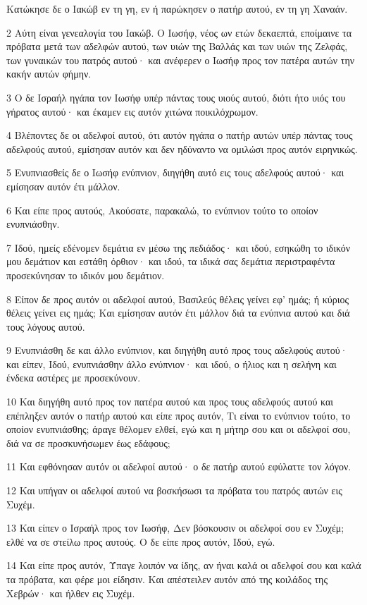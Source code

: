 \par Κατώκησε δε ο Ιακώβ εν τη γη, εν ή παρώκησεν ο πατήρ αυτού, εν τη γη Χαναάν.
\par 2 Αύτη είναι γενεαλογία του Ιακώβ. Ο Ιωσήφ, νέος ων ετών δεκαεπτά, εποίμαινε τα πρόβατα μετά των αδελφών αυτού, των υιών της Βαλλάς και των υιών της Ζελφάς, των γυναικών του πατρός αυτού· και ανέφερεν ο Ιωσήφ προς τον πατέρα αυτών την κακήν αυτών φήμην.
\par 3 Ο δε Ισραήλ ηγάπα τον Ιωσήφ υπέρ πάντας τους υιούς αυτού, διότι ήτο υιός του γήρατος αυτού· και έκαμεν εις αυτόν χιτώνα ποικιλόχρωμον.
\par 4 Βλέποντες δε οι αδελφοί αυτού, ότι αυτόν ηγάπα ο πατήρ αυτών υπέρ πάντας τους αδελφούς αυτού, εμίσησαν αυτόν και δεν ηδύναντο να ομιλώσι προς αυτόν ειρηνικώς.
\par 5 Ενυπνιασθείς δε ο Ιωσήφ ενύπνιον, διηγήθη αυτό εις τους αδελφούς αυτού· και εμίσησαν αυτόν έτι μάλλον.
\par 6 Και είπε προς αυτούς, Ακούσατε, παρακαλώ, το ενύπνιον τούτο το οποίον ενυπνιάσθην.
\par 7 Ιδού, ημείς εδένομεν δεμάτια εν μέσω της πεδιάδος· και ιδού, εσηκώθη το ιδικόν μου δεμάτιον και εστάθη όρθιον· και ιδού, τα ιδικά σας δεμάτια περιστραφέντα προσεκύνησαν το ιδικόν μου δεμάτιον.
\par 8 Είπον δε προς αυτόν οι αδελφοί αυτού, Βασιλεύς θέλεις γείνει εφ' ημάς; ή κύριος θέλεις γείνει εις ημάς; Και εμίσησαν αυτόν έτι μάλλον διά τα ενύπνια αυτού και διά τους λόγους αυτού.
\par 9 Ενυπνιάσθη δε και άλλο ενύπνιον, και διηγήθη αυτό προς τους αδελφούς αυτού· και είπεν, Ιδού, ενυπνιάσθην άλλο ενύπνιον· και ιδού, ο ήλιος και η σελήνη και ένδεκα αστέρες με προσεκύνουν.
\par 10 Και διηγήθη αυτό προς τον πατέρα αυτού και προς τους αδελφούς αυτού και επέπληξεν αυτόν ο πατήρ αυτού και είπε προς αυτόν, Τι είναι το ενύπνιον τούτο, το οποίον ενυπνιάσθης; άραγε θέλομεν ελθεί, εγώ και η μήτηρ σου και οι αδελφοί σου, διά να σε προσκυνήσωμεν έως εδάφους;
\par 11 Και εφθόνησαν αυτόν οι αδελφοί αυτού· ο δε πατήρ αυτού εφύλαττε τον λόγον.
\par 12 Και υπήγαν οι αδελφοί αυτού να βοσκήσωσι τα πρόβατα του πατρός αυτών εις Συχέμ.
\par 13 Και είπεν ο Ισραήλ προς τον Ιωσήφ, Δεν βόσκουσιν οι αδελφοί σου εν Συχέμ; ελθέ να σε στείλω προς αυτούς. Ο δε είπε προς αυτόν, Ιδού, εγώ.
\par 14 Και είπε προς αυτόν, Ύπαγε λοιπόν να ίδης, αν ήναι καλά οι αδελφοί σου και καλά τα πρόβατα, και φέρε μοι είδησιν. Και απέστειλεν αυτόν από της κοιλάδος της Χεβρών· και ήλθεν εις Συχέμ.
